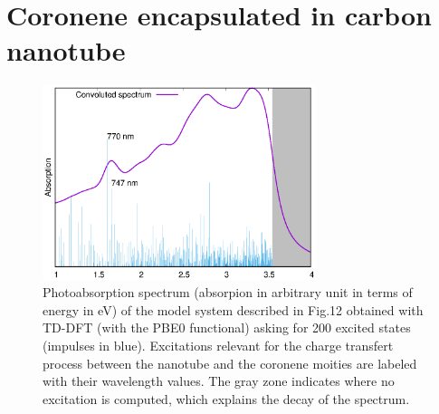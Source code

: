 \documentclass[aip]{revtex4-1}
\begin{document}
\section*{Coronene encapsulated in carbon nanotube}
\begin{figure}
\begin{center}
\includegraphics[width=8cm]{spectrum_w_impulses.eps}
\end{center}
\caption{\label{fig:spectrum_nanotube} 
Photoabsorption spectrum
(absorpion in arbitrary unit in terms of energy in eV)
of the model system described in Fig.12
obtained with TD-DFT (with the PBE0 functional) asking for 200
excited states (impulses in blue).
Excitations relevant for the charge transfert process between
the nanotube and the coronene moities are labeled with their wavelength values.
The gray zone indicates where no excitation is computed, which explains the
decay of the spectrum.
}
\end{figure}
\end{document}
